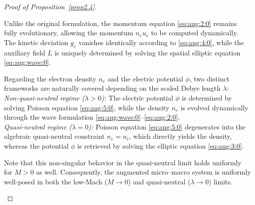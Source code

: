 \documentclass[pdflatex,final,10pt]{article}
\begin{document}
\begin{proof}[Proof of Proposition~\ref{prop2.4}]
\begin{enumerate}
Unlike the original formulation, the momentum equation \eqref{eq:aug:2:0} remains fully evolutionary, allowing the momentum $n_e u_e$ to be computed dynamically. The kinetic deviation $g_e$ vanishes identically according to \eqref{eq:aug:4:0}, while the auxiliary field $L$ is uniquely determined by solving the spatial elliptic equation \eqref{eq:aug:wave:0}.

Regarding the electron density $n_e$ and the electric potential $\phi$, two distinct frameworks are naturally covered depending on the scaled Debye length $\lambda$:\\
\emph{Non-quasi-neutral regime ($\lambda > 0$):} The electric potential $\phi$ is determined by solving Poisson equation \eqref{eq:aug:5:0}, while the density $n_e$ is evolved dynamically through the wave formulation \eqref{eq:aug:wave:0}--\eqref{eq:aug:2:0}.\\
\emph{Quasi-neutral regime ($\lambda = 0$):} Poisson equation \eqref{eq:aug:5:0} degenerates into the algebraic quasi-neutral constraint $n_e = n_i$, which directly yields the density, whereas the potential $\phi$ is retrieved by solving the elliptic equation \eqref{eq:aug:3:0}.

Note that this non-singular behavior in the quasi-neutral limit holds uniformly for $M > 0$ as well. Consequently, the augmented micro--macro system is uniformly well-posed in both the low-Mach ($M \to 0$) and quasi-neutral ($\lambda \to 0$) limits.
\end{enumerate}
\end{proof}



\end{document}
